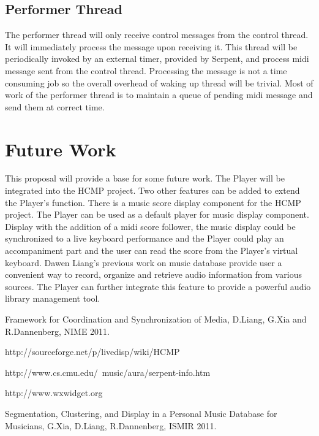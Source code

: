 \documentclass[12pt]{article} %
\begin{document}
\subsection{Performer Thread}
The performer thread will only receive control messages from the control thread. 
It will immediately process the message upon receiving it. This thread will be periodically invoked by 
an external timer, provided by Serpent, and process midi message sent from the control thread. 
Processing the message is not a time consuming job so the overall overhead of waking up 
thread will be trivial. Most of work of the performer thread is to maintain a queue of pending
midi message and send them at correct time.

\section{Future Work}
This proposal will provide a base for some future work. The Player will  
be integrated into the HCMP project. Two other features can be
added to extend the Player's function. There is a music score display component for the HCMP project. The Player can 
be used as a default player for music display component. Display with the addition of a midi 
score follower, the music display could be synchronized to a live keyboard performance and the Player could play 
an accompaniment part and the user can 
read the score from the Player's virtual keyboard. Dawen Liang's previous work 
\cite{Dawen:ISMIR2011}on music database provide user a convenient way to record, organize
and retrieve audio information from various sources. The Player can further integrate 
this feature to provide a powerful audio library management tool. 



\begin{thebibliography}{99} %

Framework for Coordination and Synchronization of Media, D.Liang, G.Xia and R.Dannenberg, NIME 2011.

http://sourceforge.net/p/livedisp/wiki/HCMP%

http://www.cs.cmu.edu/~music/aura/serpent-info.htm

http://www.wxwidget.org

Segmentation, Clustering, and Display in a Personal Music Database for Musicians,
G.Xia, D.Liang, R.Dannenberg, ISMIR 2011.

\end{thebibliography}

\end{document}
